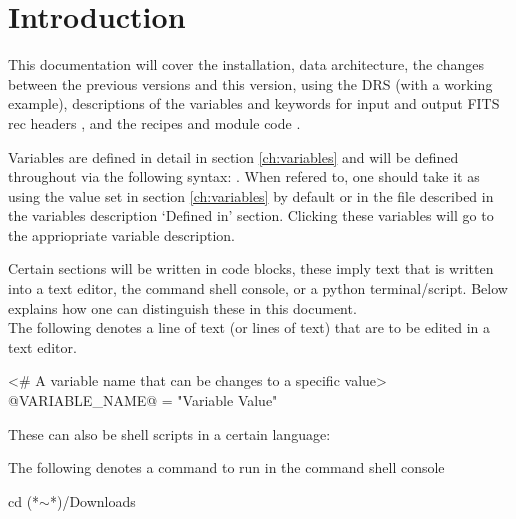 \chapter{Introduction}
\label{chapter:intro}

This documentation will cover the installation, data architecture, \ifdevguide the changes between the previous versions and this version\fi, using the DRS (with a working example), descriptions of the variables \ifdevguide and keywords for input and output FITS rec headers \fi, and the recipes \ifdevguide and module code \fi.

\noindent Variables are defined in detail in section \ref{ch:variables} and will be defined throughout via the following syntax: . When refered to, one should take it as using the value set in section \ref{ch:variables} by default or in the file described in the variables description `Defined in' section. Clicking these variables will go to the appriopriate variable description.

\noindent Certain sections will be written in code blocks, these imply text that is written into a text editor, the command shell console, or a python terminal/script. Below explains how one can distinguish these in this document. \\

\noindent The following denotes a line of text (or lines of text) that are to be edited in a text editor.
\begin{textbox}
<# A variable name that can be changes to a specific value>
@VARIABLE_NAME@ = "Variable Value"
\end{textbox}
\vspace{0.5cm}

\noindent These can also be shell scripts in a certain language:
\vspace{0.5cm}

\noindent The following denotes a command to run in the command shell console 
\begin{cmdbox}
cd (*$\sim$*)/Downloads
\end{cmdbox}
\vspace{0.5cm}

